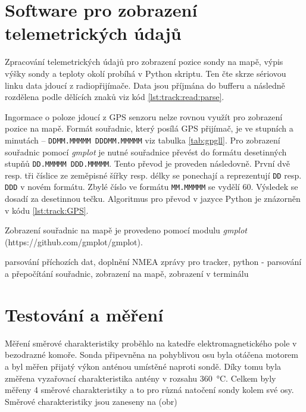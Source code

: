 \documentclass[twoside]{ctuthesis}
\theoremstyle{plain}
\theoremstyle{definition}
\theoremstyle{note}
\begin{document}
	\section{Software pro zobrazení telemetrických údajů}
	Zpracování telemetrických údajů pro zobrazení pozice sondy na mapě, výpis výšky sondy a teploty okolí probíhá v Python skriptu. Ten čte skrze sériovou linku data jdoucí z radiopřijímače. Data jsou příjmána do bufferu a následně rozdělena podle dělících znaků viz kód \ref{lst:track:read:parse}.
	

	Ingormace o poloze jdoucí z GPS senzoru nelze rovnou využít pro zobrazení pozice na mapě. Formát souřadnic, který posílá GPS přijímač, je ve stupních a minutách -- \lstinline|DDMM.MMMMM DDDMM.MMMMM| viz tabulka \ref{tab:gpgll}. Pro zobrazení souřadnic pomocí \textit{gmplot} je nutné souřadnice převést do formátu desetinných stupňů \lstinline|DD.MMMMM DDD.MMMMM|. Tento převod je proveden následovně. První dvě resp. tři číslice ze zeměpisné šířky resp. délky se ponechají a reprezentují \lstinline|DD| resp. \lstinline|DDD| v novém formátu. Zbylé číslo ve formátu \lstinline|MM.MMMMM| se vydělí 60. Výsledek se dosadí za desetinnou tečku. Algoritmus pro převod v jazyce Python je znázorněn v kódu \ref{lst:track:GPS}.

	

	Zobrazení souřadnic na mapě je provedeno pomocí modulu \textit{gmplot} (https://github.com/gmplot/gmplot). 


	parsování příchozích dat, doplnění NMEA zprávy pro tracker, python - parsování a přepočítání souřadnic, zobrazení na mapě, zobrazení v terminálu








	\section{Testování a měření}
	Měření směrové charakteristiky proběhlo na katedře elektromagnetického pole v bezodrazné komoře. Sonda připevněna na pohyblivou osu byla otáčena motorem a byl měřen přijatý výkon anténou umístěné naproti sondě. Díky tomu byla změřena vyzařovací charakteristika antény v rozsahu 360~°C. Celkem byly měřeny 4 směrové charakteristiky a to pro různá natočení sondy kolem své osy. Směrové charakteristiky jsou zaneseny na (obr)
\end{document}
